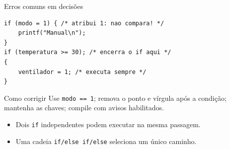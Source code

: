 \begin{frame}[fragile]{Erros comuns em decisões}
\begin{lstlisting}
if (modo = 1) { /* atribui 1: nao compara! */
    printf("Manual\n");
}
if (temperatura >= 30); /* encerra o if aqui */
{
    ventilador = 1; /* executa sempre */
}
\end{lstlisting}
\begin{block}{Como corrigir}
Use \texttt{modo == 1}; remova o ponto e vírgula após a condição; mantenha as chaves; compile com avisos habilitados.
\end{block}
\begin{itemize}
\item Dois \texttt{if} independentes podem executar na mesma passagem.
\item Uma cadeia \texttt{if/else if/else} seleciona um único caminho.
\end{itemize}
\end{frame}
